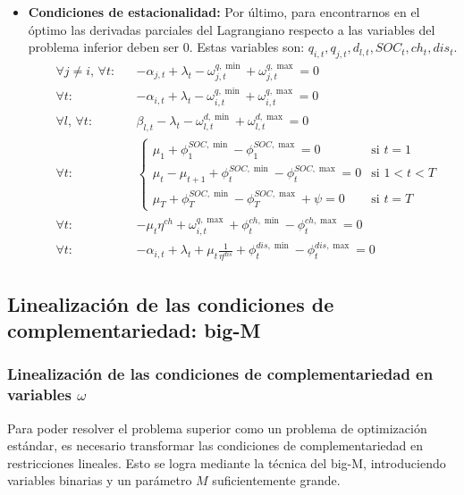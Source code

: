 \documentclass[a4paper,11pt]{article}
\begin{document}
\begin{itemize}
    \item \textbf{Condiciones de estacionalidad:}
    Por último, para encontrarnos en el óptimo las derivadas parciales del Lagrangiano respecto a las variables del problema inferior deben ser 0. Estas variables son: $q_{i,t}, q_{j,t}, d_{l,t}, SOC_t, ch_t, dis_t$.
    \begin{align}
        &\forall j \neq i,\, \forall t: && -\alpha_{j,t} + \lambda_t - \omega^{q,\min}_{j,t} + \omega^{q,\max}_{j,t} = 0 \\
        &\forall t: && -\alpha_{i,t} + \lambda_t - \omega^{q,\min}_{i,t} + \omega^{q,\max}_{i,t} = 0 \\
        &\forall l,\, \forall t: && \beta_{l,t} - \lambda_t - \omega^{d,\min}_{l,t} + \omega^{d,\max}_{l,t} = 0 \\
        &\forall t: && \begin{cases}
            \mu_1 + \phi_1^{SOC,\min} - \phi_1^{SOC,\max} = 0 & \text{si } t=1 \\
            \mu_t - \mu_{t+1} + \phi_t^{SOC,\min} - \phi_t^{SOC,\max} = 0 & \text{si } 1 < t < T \\
            \mu_T + \phi_T^{SOC,\min} - \phi_T^{SOC,\max} + \psi = 0 & \text{si } t=T
        \end{cases} \\
        &\forall t: && - \mu_t \eta^{ch} + \omega^{q,\max}_{i,t} + \phi_t^{ch,\min} - \phi_t^{ch,\max} = 0 \\
        &\forall t: && - \alpha_{i,t} + \lambda_t + \mu_t \frac{1}{\eta^{dis}} + \phi_t^{dis,\min} - \phi_t^{dis,\max} = 0
    \end{align}

\end{itemize}

\subsection{Linealización de las condiciones de complementariedad: big-M}

\subsubsection{Linealización de las condiciones de complementariedad en variables $\omega$}

Para poder resolver el problema superior como un problema de optimización estándar, es necesario transformar las condiciones de complementariedad en restricciones lineales. Esto se logra mediante la técnica del big-M, introduciendo variables binarias y un parámetro $M$ suficientemente grande.
\end{document}
